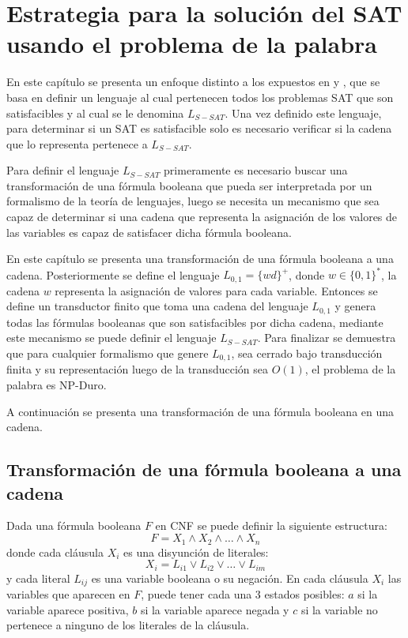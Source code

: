 \chapter{Estrategia para la solución del SAT usando el problema de la palabra}
\label{chap:LSATFT}

En este capítulo se presenta un enfoque distinto a los expuestos en \cite{aCFSAT} y \cite{aSRCSAT}, que se basa 
en definir un lenguaje al cual pertenecen todos los problemas SAT que son satisfacibles y al cual se le 
denomina $L_{S-SAT}$. Una vez definido este lenguaje, para determinar si un SAT es satisfacible solo es 
necesario verificar si la cadena que lo representa pertenece a $L_{S-SAT}$.

Para definir el lenguaje $L_{S-SAT}$ primeramente es necesario buscar una transformación de una fórmula booleana
que pueda ser interpretada por un formalismo de la teoría de lenguajes, luego se necesita un mecanismo que sea capaz
de determinar si una cadena que representa la asignación de los valores de las variables es capaz de satisfacer dicha 
fórmula booleana.

En este capítulo se presenta una transformación de una fórmula booleana a una cadena. Posteriormente se define 
el lenguaje $L_{0,1}=\{wd\}^+$, donde $w\in\{0,1\}^*$, la cadena $w$ representa la asignación de valores para cada
variable. Entonces se define un transductor finito que toma una cadena del lenguaje $L_{0,1}$ y genera todas las 
fórmulas booleanas que son satisfacibles por dicha cadena, mediante este mecanismo se puede definir el lenguaje
$L_{S-SAT}$. Para finalizar se demuestra que para cualquier formalismo que genere $L_{0,1}$, sea cerrado bajo transducción
finita y su representación luego de la transducción sea $O(1)$, el problema de la palabra es NP-Duro.

A continuación se presenta una transformación de una fórmula booleana en una cadena.

\section{Transformación de una fórmula booleana a una cadena}

Dada una fórmula booleana $F$ en CNF se puede definir la siguiente estructura:
$$F=X_1 \wedge X_2 \wedge \ldots \wedge X_n$$
donde cada cláusula $X_i$ es una disyunción de literales:
$$X_i=L_{i1} \vee L_{i2} \vee \ldots \vee L_{im}$$
y cada literal $L_{ij}$ es una variable booleana o su negación. En cada cláusula $X_i$ las variables que aparecen en $F$, puede tener cada una 3 estados posibles: $a$ si la variable aparece positiva, $b$ si la variable aparece negada y $c$ si la variable no pertenece a ninguno de los literales de la cláusula.

